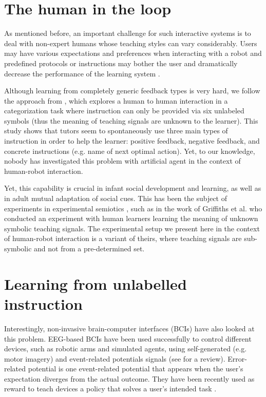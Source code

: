 \section{The human in the loop}

As mentioned before, an important challenge for such interactive systems is to deal with non-expert humans whose teaching styles can vary considerably. Users may have various expectations and preferences when interacting with a robot and predefined protocols or instructions may bother the user and dramatically decrease the performance of the learning system \cite{rouanet2013impact}. 

Although learning from completely generic feedback types is very hard, we follow the approach from \cite{griffiths2012bottom}, which explores a human to human interaction in a categorization task where instruction can only be provided via six unlabeled symbols (thus the meaning of teaching signals are unknown to the learner). This study shows that tutors seem to spontaneously use three main types of instruction in order to help the learner: positive feedback, negative feedback, and concrete instructions (e.g. name of next optimal action). Yet, to our knowledge, nobody has investigated this problem with artificial agent in the context of human-robot interaction.


Yet, this capability is crucial in infant social development and learning, as well as in adult mutual adaptation of social cues. This has been the subject of experiments in experimental semiotics \cite{galantucci2009experimental}, such as in the work of Griffiths et al. \cite{griffiths2012bottom} who conducted an experiment with human learners learning the meaning of unknown symbolic teaching signals. The experimental setup we present here in the context of human-robot interaction is a variant of theirs, where teaching signals are sub-symbolic and not from a pre-determined set.


\section{Learning from unlabelled instruction}



Interestingly, non-invasive brain-computer interfaces (BCIs) have also looked at this problem. EEG-based BCIs have been used successfully to control different devices, such as robotic arms and simulated agents, using self-generated (e.g. motor imagery) and event-related potentials signals (see \cite{millan10} for a review). 
%
Error-related potential is one event-related potential that appears when the user's expectation diverges from the actual outcome. They have been recently used as reward to teach devices a policy that solves a user's intended task \cite{chavarriaga2010learning,iturrate2010robot}.

